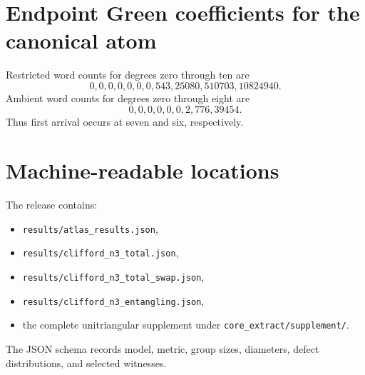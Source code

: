 \section{Endpoint Green coefficients for the canonical atom}
Restricted word counts for degrees zero through ten are
\[
0,0,0,0,0,0,0,543,25080,510703,10824940.
\]
Ambient word counts for degrees zero through eight are
\[
0,0,0,0,0,0,2,776,39454.
\]
Thus first arrival occurs at seven and six, respectively.

\section{Machine-readable locations}
The release contains:
\begin{itemize}
\item \texttt{results/atlas\_results.json},
\item \texttt{results/clifford\_n3\_total.json},
\item \texttt{results/clifford\_n3\_total\_swap.json},
\item \texttt{results/clifford\_n3\_entangling.json},
\item the complete unitriangular supplement under \texttt{core\_extract/supplement/}.
\end{itemize}
The JSON schema records model, metric, group sizes, diameters, defect distributions, and selected witnesses.
